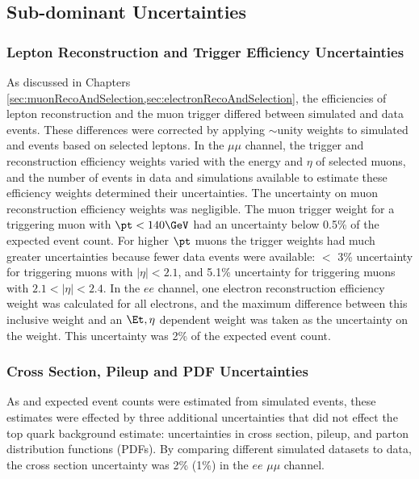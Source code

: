 \subsection{Sub-dominant Uncertainties}
\label{sec:subdominantUncs}

\subsubsection{Lepton Reconstruction and Trigger Efficiency Uncertainties}
\label{sec:leptonRecoTriggerEffUnc}
As discussed in Chapters \ref{sec:muonRecoAndSelection,sec:electronRecoAndSelection}, the efficiencies 
of lepton reconstruction and the muon trigger differed between simulated and data events.  These differences 
were corrected by applying $\sim$unity weights to simulated \DY and \WR events based on selected leptons.  
In the $\mu\mu$ channel, the trigger and reconstruction efficiency weights varied with the energy and $\eta$ of selected muons, and the 
number of events in data and simulations available to estimate these efficiency weights determined 
their uncertainties.  The uncertainty on muon reconstruction efficiency weights was negligible.  The muon trigger 
weight for a triggering muon with $\pt < 140\GeV$ had an uncertainty below 0.5\% of the expected event 
count.  For higher $\pt$ muons the trigger weights had much greater uncertainties because fewer data 
events were available: $<$ 3\% uncertainty for triggering muons with $|\eta| < 2.1$, and 5.1\% uncertainty 
for triggering muons with $2.1 < |\eta| < 2.4$.  In the $ee$ channel, one electron reconstruction 
efficiency weight was calculated for all electrons, and the maximum difference between this inclusive 
weight and an $\Et, \eta$ dependent weight was taken as the uncertainty on the weight.  This uncertainty 
was 2\% of the expected event count.

\subsubsection{Cross Section, Pileup and PDF Uncertainties}
\label{sec:crossSxnPileupPdfUnc}
As \DY and \WR expected event counts were estimated from simulated events, these estimates were effected 
by three additional uncertainties that did not effect the top quark background estimate: uncertainties 
in cross section, pileup, and parton distribution functions (PDFs).  By comparing different simulated 
\DY datasets to data, the \DY cross section uncertainty was 2\% (1\%) in the $ee$ $\mu\mu$ channel.


